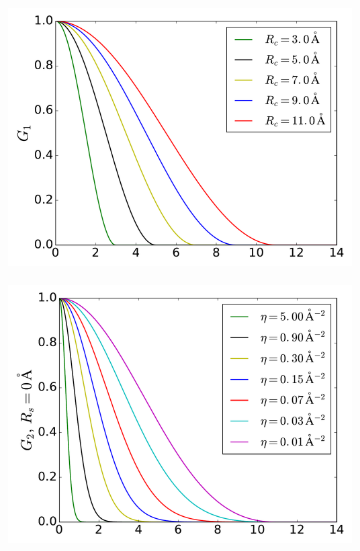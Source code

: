 \documentclass[twoside,english]{uiofysmaster}
\begin{document}
\begin{figure}[H] 
  \begin{subfigure}[b]{0.5\linewidth}
    \centering
    \includegraphics[width=\linewidth]{Figures/Theory/G1.pdf} 
    \label{fig:radialSymmetriFunctions:a} 
    \vspace{1ex}
  \end{subfigure}%
  \begin{subfigure}[b]{0.5\linewidth}
    \centering
    \includegraphics[width=\linewidth]{Figures/Theory/G2_1.pdf} 
    \label{fig:radialSymmetriFunctions:b} 
    \vspace{1ex}
  \end{subfigure} 
  \begin{subfigure}[b]{0.5\linewidth}

\end{subfigure}
\end{figure}
\end{document}
